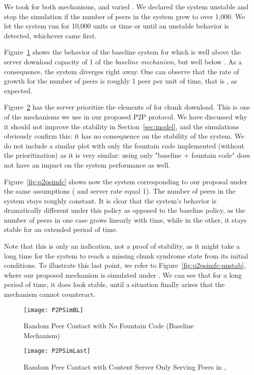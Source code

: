 \documentclass[11pt,conference]{IEEEtran}
\begin{document}
We took  for both mechanisms, and varied . We declared the system unstable and stop the simulation if the number of peers in the system grew to over 1,000. We let the system run for 10,000 units or time or until an unstable behavior is detected, whichever came first.

Figure~\ref{fig:p2psimbl} shows the behavior of the baseline system for  which is well above the server download capacity of 1 of the {\em baseline mechanism}, but well below . As a consequence, the system diverges right away. One can observe that the rate of growth for the number of peers is roughly 1 peer per unit of time, that is , as expected.

Figure~\ref{fig:p2psimlast} has the server prioritize the elements of  for chunk download. This is one of the mechanisms we use in our proposed P2P protocol. We have discussed why it should not improve the stability in Section~\ref{sec:model}, and the simulations obviously confirm this: it has no consequence on the stability of the system. We do not include a similar plot with only the fountain code implemented (without the prioritization) as it is very similar: using only "baseline + fountain code" does not have an impact on the system performance as well.

Figure~\ref{fig:p2psimfc} shows now the system corresponding to our proposal under the same assumptions ( and server rate equal 1). The number of peers in the system stays roughly constant. It is clear that the system's behavior is dramatically different under this policy as opposed to the baseline policy, as the number of peers in one case grows linearly with time, while in the other, it stays stable for an extended period of time.

Note that this is only an indication, not a proof of stability, as it might take a long time for the system to reach a missing chunk syndrome state from its initial conditions. To illustrate this last point, we refer to Figure~\ref{fig:p2psimfc-unstab}, where our proposed mechanism is simulated under . We can see that for a long period of time, it does look stable, until a situation finally arises that the mechanism cannot counteract.

\begin{figure}[!t]
\centering
\texttt{[image: P2PSimBL]}
\caption{Random Peer Contact with No Fountain Code (Baseline Mechanism) }
\label{fig:p2psimbl}
\end{figure}

\begin{figure}[!t]
\centering
\texttt{[image: P2PSimLast]}
\caption{Random Peer Contact with Content Server Only Serving Peers in , }
\label{fig:p2psimlast}
\end{figure}
\end{document}
